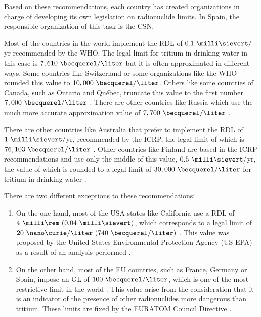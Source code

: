 Based on these recommendations, each country has created organizations in charge of developing its own legislation on radionuclide limits. In Spain, the responsible organization of this task is the CSN.

Most of the countries in the world implement the RDL of $0.1~\milli\sievert/$yr recommended by the WHO. The legal limit for tritium in drinking water in this case is $7,610~\becquerel/\liter$  but it is often approximated in different ways. Some countries like Switzerland \cite{Switzerland_GL} or some organizations like the WHO \cite{WHO_GL} rounded this value to $10,000~\becquerel/\liter$. Others like some countries of Canada, such as Ontario and Québec, truncate this value to the first number $7,000~\becquerel/\liter$ \cite{Ontario_GL, Quebec_GL}. There are other countries like Russia which use the much more accurate approximation value of $7,700~\becquerel/\liter$ \cite{Russia_GL}.

There are other countries like Australia that prefer to implement the RDL of $1~\milli\sievert/$yr, recommended by the ICRP, the legal limit of which is $76,103~\becquerel/\liter$ \cite{Australia_GL}. Other countries like Finland are based in the ICRP recommendations and use only the middle of this value, $0.5~\milli\sievert/$yr, the value of which is rounded to a legal limit of $30,000~\becquerel/\liter$ for tritium in drinking water \cite{Finland_GL}.

There are two different exceptions to these recommendations:
\begin{enumerate}
\item{} On the one hand, most of the USA states like California use a RDL of $4~\milli\rem~(0.04~\milli\sievert)$, which corresponds to a legal limit of $20~\nano\curie/\liter~(740~\becquerel/\liter)$ \cite{California_GL}. This value was proposed by the United States Environmental Protection Agency (US EPA) as a result of an analysis performed \cite{USEPA_GL}.

\item{} On the other hand, most of the EU countries, such as France, Germany or Spain, impose an GL of $100~\becquerel/\liter$, which is one of the most restrictive limit in the world \cite{France_GL, Germany_GL, Spain_GL}. This value arise from the consideration that it is an indicator of the presence of other radionuclides more dangerous than tritium. These limits are fixed by the EURATOM Council Directive \cite{EURATOM_GL}. 
\end{enumerate}

